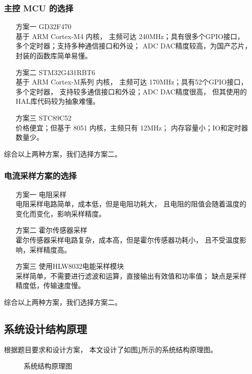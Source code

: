 \documentclass[a4paper,12pt]{article}
\begin{document}
\subsubsection{主控 MCU 的选择}
\begin{enumerate}
    \item[方案一] GD32F470 
    \\
    基于 ARM Cortex-M4 内核，
    主频可达 240MHz；具有很多个GPIO接口，
    多个定时器；支持多种通信接口和外设；
    ADC DAC精度较高，为国产芯片，封装的函数库简单易懂。
    \item[方案二] STM32G431RBT6 
    \\ 
    基于 ARM Cortex-M系列 内核，
    主频可达 170MHz；具有52个GPIO接口，多个定时器，
    支持较多通信接口和外设；ADC DAC精度很高，
    但其使用的HAL库代码较为抽象难懂。    
    \item[方案三] STC89C52 
    \\ 
    价格便宜；但基于 8051 内核，主频只有 12MHz；
    内存容量小；IO和定时器数量少。
\end{enumerate}
综合以上两种方案，我们选择方案二。

\subsubsection{电流采样方案的选择}
\begin{enumerate}
    \item[方案一] 电阻采样 
    \\ 
    电阻采样电路简单，成本低，但是电阻功耗大，
    且电阻的阻值会随着温度的变化而变化，影响采样精度。
    \item[方案二] 霍尔传感器采样 
    \\ 
    霍尔传感器采样电路复杂，成本高，但是霍尔传感器功耗小，
    且不受温度影响，采样精度高。
    \item[方案三] 使用HLW8032电能采样模块  
    \\
    采样简单，不需要进行滤波和运算，直接输出有效值和功率值；
    缺点是采样精度低，传输速度慢。
\end{enumerate}
综合以上两种方案，我们选择方案二。

\subsection{系统设计结构原理}
根据题目要求和设计方案，
本文设计了如图\ref{fig2}所示的系统结构原理图。
\begin{figure}[htbp]
\centering
\caption{系统结构原理图}
\label{fig2}
\end{figure}
\end{document}
